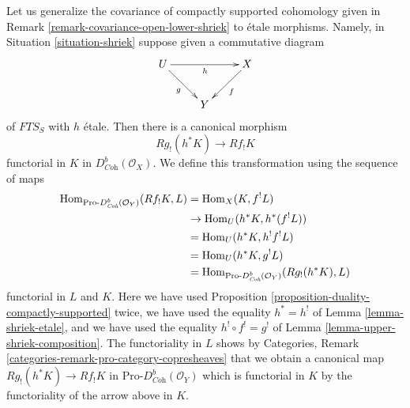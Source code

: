 \begin{remark}
\label{remark-covariance-etale-lower-shriek}
Let us generalize the covariance of compactly supported cohomology
given in Remark \ref{remark-covariance-open-lower-shriek}
to \'etale morphisms. Namely, in Situation \ref{situation-shriek}
suppose given a commutative diagram
$$
\xymatrix{
U \ar[rr]_h \ar[rd]_g & & X \ar[ld]^f \\
& Y
}
$$
of $\textit{FTS}_S$ with $h$ \'etale. Then there is a canonical morphism
$$
Rg_!(h^*K) \longrightarrow Rf_!K
$$
functorial in $K$ in $D^b_{\textit{Coh}}(\mathcal{O}_X)$. We define
this transformation using the sequence of maps
\begin{align*}
\mathop{\mathrm{Hom}}\nolimits_{\text{Pro-}D^b_{\textit{Coh}}(\mathcal{O}_Y)}(Rf_!K, L)
& =
\mathop{\mathrm{Hom}}\nolimits_X(K, f^!L) \\
& \to
\mathop{\mathrm{Hom}}\nolimits_U(h^*K, h^*(f^!L)) \\
& =
\mathop{\mathrm{Hom}}\nolimits_U(h^*K, h^!f^!L) \\
& =
\mathop{\mathrm{Hom}}\nolimits_U(h^*K, g^!L) \\
& =
\mathop{\mathrm{Hom}}\nolimits_{\text{Pro-}D^b_{\textit{Coh}}(\mathcal{O}_Y)}(Rg_!(h^*K), L)
\end{align*}
functorial in $L$ and $K$. Here we have used
Proposition \ref{proposition-duality-compactly-supported}
twice, we have used the equality $h^* = h^!$ of
Lemma \ref{lemma-shriek-etale}, and we have used the equality
$h^! \circ f^! = g^!$ of Lemma \ref{lemma-upper-shriek-composition}.
The functoriality in $L$ shows by
Categories, Remark \ref{categories-remark-pro-category-copresheaves}
that we obtain a canonical map $Rg_!(h^*K) \to Rf_!K$ in
$\text{Pro-}D^b_{\textit{Coh}}(\mathcal{O}_Y)$ which is
functorial in $K$ by the functoriality of the arrow above in $K$.
\end{remark}

